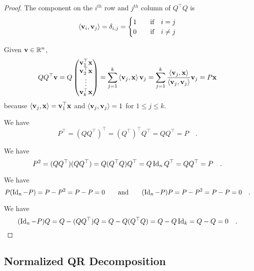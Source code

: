\begin{proof}
  The component on the $i^{th}$ row and $j^{th}$ column of
$Q^\top Q$ is
\[
\left\langle{\mathbf{v}_i} , {\mathbf{v}_j}\right\rangle = \delta_{i,j}
= \begin{cases}
1 & \quad \text{if} \quad i = j \\
0 & \quad \text{if} \quad i \neq j
\end{cases}
\]

 Given $\mathbf{v} \in \mathbb{R}^n$,
\[
Q Q^\top \mathbf{v} = Q
\begin{pmatrix}
\mathbf{v}_1^\top \mathbf{x} \\
\mathbf{v}_2^\top \mathbf{x} \\
\vdots \\
\mathbf{v}_k^\top \mathbf{x}
\end{pmatrix}
= \sum_{j=1}^k \left\langle{\mathbf{v}_j} , {\mathbf{x}}\right\rangle \mathbf{v}_j
= \sum_{j=1}^k \frac{\left\langle{\mathbf{v}_j} , {\mathbf{x}}\right\rangle}{\left\langle{\mathbf{v}_j} , {\mathbf{v}_j}\right\rangle}
\mathbf{v}_j = P\mathbf{x}
\]
because $\left\langle{\mathbf{v}_j} , {\mathbf{x}}\right\rangle= \mathbf{v}_1^\top \mathbf{x}$
and $\left\langle{\mathbf{v}_j} , {\mathbf{v}_j}\right\rangle=1$ for $1\leq j \leq k$.

 We have
\[
  P^\top = (Q Q^\top)^\top = (Q^\top)^\top Q^\top = Q Q^\top = P \quad .
\]

 We have
\[
  P^2 = (Q Q^\top)(Q Q^\top) = Q (Q^\top Q) Q^\top
  = Q \operatorname{Id}_n Q^\top = Q Q^\top = P \quad .
\]

 We have
\[
 P(\operatorname{Id}_n-P) = P - P^2 = P - P = 0 \qquad \text{and} \qquad
 (\operatorname{Id}_n - P)P = P - P^2 = P - P = 0 \quad .
\]

 We have
\[
  (\operatorname{Id}_n - P)Q = Q - (Q Q^\top) Q = Q - Q ( Q^\top Q)
  = Q - Q \operatorname{Id}_k = Q - Q = 0 \quad .  \qedhere
\]
\end{proof}

\subsection{Normalized QR Decomposition}\label{C14L31}


